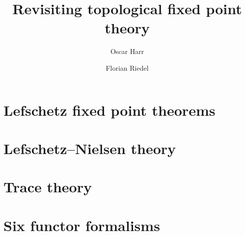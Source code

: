 \documentclass[english]{article}
\title{Revisiting topological fixed point theory}
\author{Oscar Harr \and Florian Riedel}
\begin{document}
\maketitle

\tableofcontents


\section{Lefschetz fixed point theorems}

% 

% 


\section{Lefschetz--Nielsen theory}\label{sec:nielsen-theory}


%

\appendix

\section{Trace theory}\label{sec: trace theory}


\section{Six functor formalisms}\label{sec: verdier duality}

%

%
%
\printbibliography{}
\end{document}
